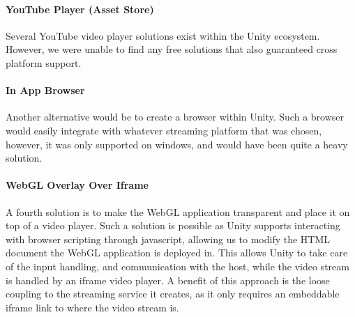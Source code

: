 \paragraph{YouTube Player (Asset Store)}
Several YouTube video player solutions exist within the Unity ecosystem. However, we were unable to find any free solutions that also guaranteed cross platform support. 

\paragraph{In App Browser}
Another alternative would be to create a browser within Unity\cite{unity_simple_browser}. Such a browser would easily integrate with whatever streaming platform that was chosen, however, it was only supported on windows, and would have been quite a heavy solution.

\paragraph{WebGL Overlay Over Iframe}
A fourth solution is to make the WebGL application transparent and place it on top of a video player. Such a solution is possible as Unity supports interacting with browser scripting through javascript\cite{unity_webgl_javascript_interaction}, allowing us to modify the HTML document the WebGL application is deployed in. 
This allows Unity to take care of the input handling, and communication with the host, while the video stream is handled by an iframe video player. A benefit of this approach is the loose coupling to the streaming service it creates, as it only requires an embeddable iframe link to where the video stream is.

    

